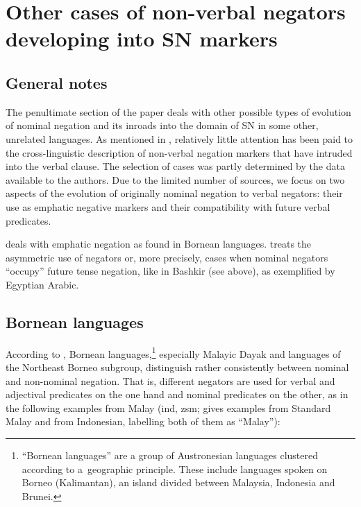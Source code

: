 \documentclass[output=paper,draft,draftmode,colorlinks,citecolor=brown]{langscibook}
\begin{document}
\section{Other cases of non-verbal negators developing into SN markers}\label{sec:BK4}

\subsection{General notes}\label{sec:BK4.1}

The penultimate section of the paper deals with other possible types of evolution of nominal negation and its inroads into the domain of SN in some other, unrelated languages. As mentioned in , relatively little attention has been paid to the cross-linguistic description of non-verbal negation markers that have intruded into the verbal clause. The selection of cases was partly determined by the data available to the authors. Due to the limited number of sources, we focus on two aspects of the evolution of originally nominal negation to verbal negators: their use as emphatic negative markers and their compatibility with future verbal predicates.

 deals with emphatic negation as found in Bornean languages.  treats the asymmetric use of negators or, more precisely, cases when nominal negators “occupy” future tense negation, like in Bashkir (see  above), as exemplified by Egyptian Arabic.

\subsection{Bornean languages}\label{sec:BK4.2}

According to \citet{kroeger2014a}, Bornean languages,\footnote{“Bornean languages” are a group of Austronesian languages clustered according to a geographic principle. These include languages spoken on Borneo (Kalimantan), an island divided between Malaysia, Indonesia and Brunei.} especially Malayic Dayak and languages of the Northeast Borneo subgroup, distinguish rather consistently between nominal and non-nominal negation. That is, different negators are used for verbal and adjectival predicates on the one hand and nominal predicates on the other, as in the following examples from Malay (ind, zsm; \citeauthor{kroeger2014a} gives examples from Standard Malay and from Indonesian, labelling both of them as “Malay”):
\end{document}
